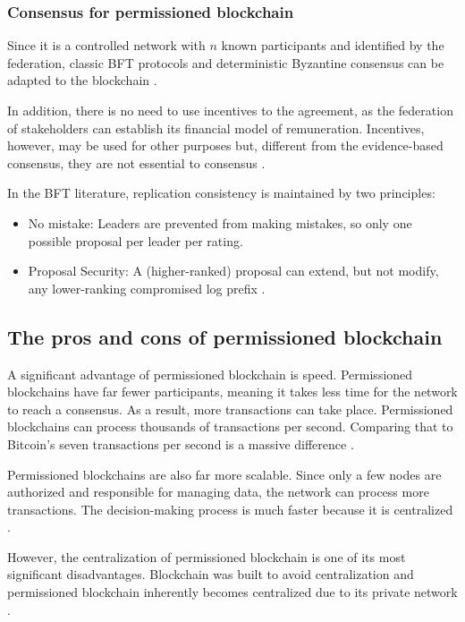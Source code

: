 \subsubsection{Consensus for permissioned blockchain}\label{sec:consensoPrivada}
Since it is a controlled network with $n$ known participants and identified by the federation, classic \acf{BFT} protocols and deterministic Byzantine consensus can be adapted to the blockchain \cite{androulaki2018hyperledger}.

In addition, there is no need to use incentives to the agreement, as the federation of stakeholders can establish its financial model of remuneration. Incentives, however, may be used for other purposes but, different from the evidence-based consensus, they are not essential to consensus \cite{greve2018blockchain}.

In the \ac{BFT} literature, replication consistency is maintained by two principles:

\begin{itemize}
\item No mistake: Leaders are prevented from making mistakes, so only one possible proposal per leader per rating.
\item Proposal Security: A (higher-ranked) proposal can extend, but not modify, any lower-ranking compromised log prefix \cite{abraham2017blockchain}.
\end{itemize}

\subsection{The pros and cons of permissioned blockchain}\label{sec:prosConsPriv}

A significant advantage of permissioned blockchain is speed. Permissioned blockchains have far fewer participants, meaning it takes less time for the network to reach a consensus. As a result, more transactions can take place. Permissioned blockchains can process thousands of transactions per second. Comparing that to Bitcoin's seven transactions per second is a massive difference \cite{di17blockchain}.

Permissioned blockchains are also far more scalable. Since only a few nodes are authorized and responsible for managing data, the network can process more transactions. The decision-making process is much faster because it is centralized \cite{selfkeyOrg}.

However, the centralization of permissioned blockchain is one of its most significant disadvantages. Blockchain was built to avoid centralization and permissioned blockchain inherently becomes centralized due to its private network \cite{blockgeeks2018deeper}.

